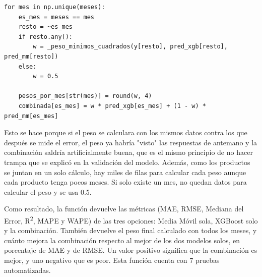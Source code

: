 \label{lst:combinacion_evaluacion}
\begin{verbatim}
for mes in np.unique(meses):
    es_mes = meses == mes
    resto = ~es_mes
    if resto.any():
        w = _peso_minimos_cuadrados(y[resto], pred_xgb[resto], pred_mm[resto])
    else:
        w = 0.5

    pesos_por_mes[str(mes)] = round(w, 4)
    combinada[es_mes] = w * pred_xgb[es_mes] + (1 - w) * pred_mm[es_mes]
\end{verbatim}

Esto se hace porque si el peso se calculara con los mismos datos contra los que después se mide el error, el peso ya habría "visto" las respuestas de antemano y la combinación saldría artificialmente buena, que es el mismo principio de no hacer trampa que se explicó en la validación del modelo. Además, como los productos se juntan en un solo cálculo, hay miles de filas para calcular cada peso aunque cada producto tenga pocos meses. Si solo existe un mes, no quedan datos para calcular el peso y se usa 0.5.

Como resultado, la función devuelve las métricas (MAE, RMSE, Mediana del Error, R\textsuperscript{2}, MAPE y WAPE) de las tres opciones: Media Móvil sola, XGBoost solo y la combinación. También devuelve el peso final calculado con todos los meses, y cuánto mejora la combinación respecto al mejor de los dos modelos solos, en porcentaje de MAE y de RMSE. Un valor positivo significa que la combinación es mejor, y uno negativo que es peor. Esta función cuenta con 7 pruebas automatizadas.
